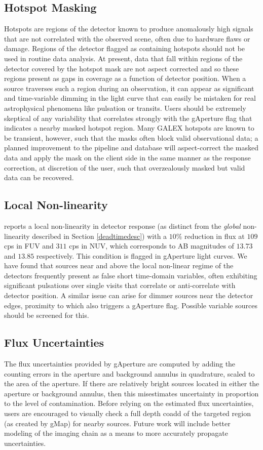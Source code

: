 \documentclass[preprint]{aastex}
\begin{document}
\subsection{Hotspot Masking}
\label{hotspot}
Hotspots are regions of the detector known to produce anomalously high signals that are not correlated with the observed scene, often due to hardware flaws or damage. Regions of the detector flagged as containing hotspots should not be used in routine data analysis. At present, data that fall within regions of the detector covered by the hotspot mask are not aspect corrected and so these regions present as gaps in coverage as a function of detector position. When a source traverses such a region during an observation, it can appear as significant and time-variable dimming in the light curve that can easily be mistaken for real astrophysical phenomena like pulsation or transits. Users should be extremely skeptical of any variability that correlates strongly with the gAperture flag that indicates a nearby masked hotspot region. Many GALEX hotspots are known to be transient, however, such that the masks often block valid observational data; a planned improvement to the pipeline and database will aspect-correct the masked data and apply the mask on the client side in the same manner as the response correction, at discretion of the user, such that overzealously masked but valid data can be recovered.

\subsection{Local Non-linearity}
\label{nonlinear}
\citet{mor2007} reports a local non-linearity in detector response (as distinct from the \emph{global} non-linearity described in Section \ref{deadtimedesc}) with a $10\%$ reduction in flux at $109$ cps in FUV and $311$ cps in NUV, which corresponds to AB magnitudes of $13.73$ and $13.85$ respectively. This condition is flagged in gAperture light curves. We have found that sources near and above the local non-linear regime of the detectors frequently present as false short time-domain variables, often exhibiting significant pulsations over single visits that correlate or anti-correlate with detector position. A similar issue can arise for dimmer sources near the detector edges, proximity to which also triggers a gAperture flag. Possible variable sources should be screened for this.

\subsection{Flux Uncertainties}
\label{fluxuncert}
The flux uncertainties provided by gAperture are computed by adding the counting errors in the aperture and background annulus in quadrature, scaled to the area of the aperture. If there are relatively bright sources located in either the aperture or background annulus, then this misestimates uncertainty in proportion to the level of contamination. Before relying on the estimated flux uncertainties, users are encouraged to visually check a full depth coadd of the targeted region (as created by gMap) for nearby sources. Future work will include better modeling of the imaging chain as a means to more accurately propagate uncertainties.
\end{document}
